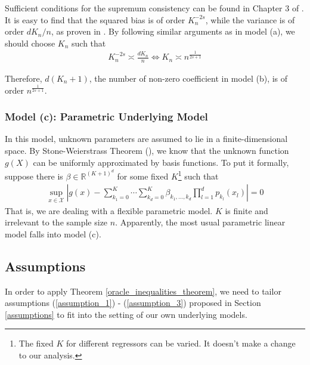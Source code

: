 \documentclass[12pt, a4paper]{article}
\theoremstyle{MAstyle} \newtheorem{assumption}{Assumption}[section]
\theoremstyle{MAstyle} \newtheorem{definition}{Definition}[section]
\theoremstyle{MAstyle} \newtheorem{theorem}{Theorem}[section]
\theoremstyle{MAstyle} \newtheorem{corollary}{Corollary}[section]
\begin{document}
                Sufficient conditions for the supremum consistency can be found in Chapter 3 of \cite{Chen_2007}. It is easy to find that the squared bias is of order $K_n^{-2s}$, while the variance is of order $dK_n/n$, as proven in \cite{Newey_1997}. By following similar arguments as in model (a), we should choose $K_n$ such that 
                \begin{align*}
                    K_n^{-2s} \asymp \frac{dK_n}{n}  \Leftrightarrow  K_n \asymp n^{\frac{1}{2s+1}}
                \end{align*}
                
                Therefore, $d(K_n+1)$, the number of non-zero coefficient in model (b), is of order $n^{\frac{1}{2s+1}}$. 

                \subsubsection{Model (c): Parametric Underlying Model}\label{parametric_model}

                In this model, unknown parameters are assumed to lie in a finite-dimensional space. By Stone-Weierstrass Theorem (\cite{Stone_1948}), we know that the unknown function $g(X)$ can be uniformly approximated by basis functions. To put it formally, suppose there is $\beta \in \mathbb{R}^{(K+1)^d}$ for some fixed $K$\footnote{The fixed $K$ for different regressors can be varied. It doesn't make a change to our analysis.} such that
                \begin{align}
                    \sup_{x \in \mathcal{X}} \left| g(x) - \sum_{k_1=0}^{K} \cdots \sum_{k_d=0}^{K} \beta_{k_1,\ldots,k_d}\prod_{l=1}^{d}p_{k_l}(x_l) \right|=0
                \end{align}
                That is, we are dealing with a flexible parametric model. $K$ is finite and irrelevant to the sample size $n$. Apparently, the most usual parametric linear model falls into model (c).

                \subsection{Assumptions}\label{dae_assumptions}

                    In order to apply Theorem \ref{oracle_inequalities_theorem}, we need to tailor assumptions (\ref{assumption_1}) - (\ref{assumption_3}) proposed in Section \ref{assumptions} to fit into the setting of our own underlying models.\\
\end{document}
